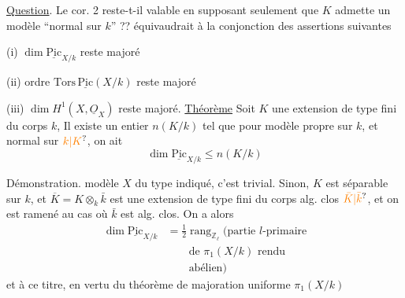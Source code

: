 \uline{Question}. Le cor. 2 reste-t-il valable
en supposant seulement que $K$ admette
un modèle ``normal sur $k$'' ??  
 équivaudrait à la conjonction des
assertions suivantes

(i) $\dim\underline{\mathrm{Pic}}_{X/k}$ reste majoré

(ii) ordre $\mathrm{Tors}\,\underline{\mathrm{Pic}}(X/k)$ reste majoré

(iii) $\dim H^1(X,\underline{O}_X)$ reste majoré.
\uline{Théorème} Soit $K$ une extension de type fini du
corps $k$,   Il
 existe un entier $n(K/k)$
tel que pour  modèle  propre sur $k$, et
normal sur $\unsure{k|K}$,  on ait 
\[
\dim\underline{\mathrm{Pic}}_{X/k}\leq n(K/k)
\]

Démonstration.  
modèle $X$ du type indiqué, c'est trivial.
Sinon, $K$ est séparable sur $k$, et
$\overline K=K\otimes_k\bar k$ est une extension de type
fini du corps alg. clos $\unsure{\bar K|\bar k}$, et on
est ramené au cas où $\bar k$ est alg. clos.
On a alors
\[
\begin{aligned}
\dim\underline{\mathrm{Pic}}_{X/k}
&=\tfrac12\operatorname{rang}_{\mathbb Z_{\ell}}
  \bigl(\text{partie $l$-primaire}\\
&\qquad \text{de $\pi_1(X/k)$ rendu}\\
&\qquad \text{abélien}\bigr)
\end{aligned}
\]
et à ce titre, en vertu du théorème
de majoration uniforme  $\pi_1(X/k)$
